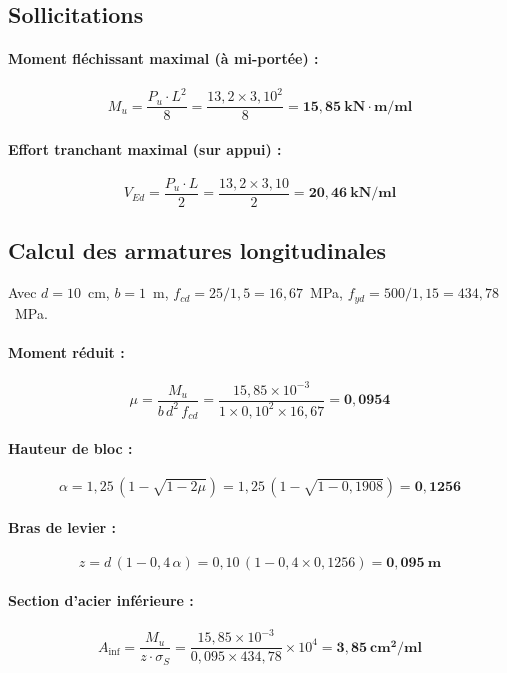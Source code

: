 \subsection{Sollicitations}

\paragraph{Moment fléchissant maximal (à mi-portée) :}
\[
  M_u = \frac{P_u \cdot L^2}{8} = \frac{13{,}2 \times 3{,}10^2}{8} = \mathbf{15{,}85~\text{kN}\cdot\text{m/ml}}
\]

\paragraph{Effort tranchant maximal (sur appui) :}
\[
  V_{Ed} = \frac{P_u \cdot L}{2} = \frac{13{,}2 \times 3{,}10}{2} = \mathbf{20{,}46~\text{kN/ml}}
\]

\subsection{Calcul des armatures longitudinales}

Avec $d = 10$~cm, $b = 1$~m, $f_{cd} = 25/1{,}5 = 16{,}67$~MPa, $f_{yd} = 500/1{,}15 = 434{,}78$~MPa.

\paragraph{Moment réduit :}
\[
  \mu = \frac{M_u}{b\,d^2\,f_{cd}}
      = \frac{15{,}85 \times 10^{-3}}{1 \times 0{,}10^2 \times 16{,}67}
      = \mathbf{0{,}0954}
\]

\paragraph{Hauteur de bloc :}
\[
  \alpha = 1{,}25\,(1 - \sqrt{1 - 2\mu})
         = 1{,}25\,(1 - \sqrt{1 - 0{,}1908})
         = \mathbf{0{,}1256}
\]

\paragraph{Bras de levier :}
\[
  z = d\,(1 - 0{,}4\,\alpha)
    = 0{,}10\,(1 - 0{,}4 \times 0{,}1256)
    = \mathbf{0{,}095~\text{m}}
\]

\paragraph{Section d'acier inférieure :}
\[
  A_\text{inf} = \frac{M_u}{z \cdot \sigma_S}
              = \frac{15{,}85 \times 10^{-3}}{0{,}095 \times 434{,}78} \times 10^4
              = \mathbf{3{,}85~\text{cm}^2/\text{ml}}
\]

